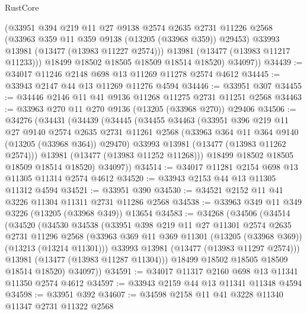 \begin{lexlean}{RustCore}
\begin{coremodule}
            (@33951
              @394
              @219
              @11
              @27
              @9138
              @2574
              @2635
              @2731
              @11226
              @2568
              (@33963 @359 @11 @359 @9138 (@13205 (@33968 @359)) @29453)
              @33993
              @13981
              (@13477 (@13983 @11227 @2574)))
            @13981
            (@13477 (@13983 @11217 @11233)))
          @18499
          @18502
          @18505
          @18509
          @18514
          @18520)
        @34097))
@34439 := @34017 @11246 @2148 @698 @13 @11269 @11278 @2574 @4612
@34445 := @33943 @2147 @44 @13 @11269 @11276 @4594
@34446 := @33951 @307
@34455 := @34446 @2146 @11 @41 @9136 @11268 @11275 @2731 @11251 @2568
@34463 := @33963 @270 @11 @270 @9136 (@13205 (@33968 @270)) @29406
@34506 := @34276
    (@34431
      (@34439
        (@34445
          (@34455
            @34463
            (@33951
              @396
              @219
              @11
              @27
              @9140
              @2574
              @2635
              @2731
              @11261
              @2568
              (@33963 @364 @11 @364 @9140 (@13205 (@33968 @364)) @29470)
              @33993
              @13981
              (@13477 (@13983 @11262 @2574)))
            @13981
            (@13477 (@13983 @11252 @11268)))
          @18499
          @18502
          @18505
          @18509
          @18514
          @18520)
        @34097))
@34514 := @34017 @11281 @2154 @698 @13 @11305 @11314 @2574 @4612
@34520 := @33943 @2153 @44 @13 @11305 @11312 @4594
@34521 := @33951 @390
@34530 := @34521 @2152 @11 @41 @3226 @11304 @11311 @2731 @11286 @2568
@34538 := @33963 @349 @11 @349 @3226 (@13205 (@33968 @349)) @13654
@34583 := @34268
    (@34506
      (@34514
        (@34520
          (@34530
            @34538
            (@33951
              @398
              @219
              @11
              @27
              @11301
              @2574
              @2635
              @2731
              @11296
              @2568
              (@33963 @369 @11 @369 @11301 (@13205 (@33968 @369)) (@13213 (@13214 @11301)))
              @33993
              @13981
              (@13477 (@13983 @11297 @2574)))
            @13981
            (@13477 (@13983 @11287 @11304)))
          @18499
          @18502
          @18505
          @18509
          @18514
          @18520)
        @34097))
@34591 := @34017 @11317 @2160 @698 @13 @11341 @11350 @2574 @4612
@34597 := @33943 @2159 @44 @13 @11341 @11348 @4594
@34598 := @33951 @392
@34607 := @34598 @2158 @11 @41 @3228 @11340 @11347 @2731 @11322 @2568

\end{coremodule}
\end{lexlean}
